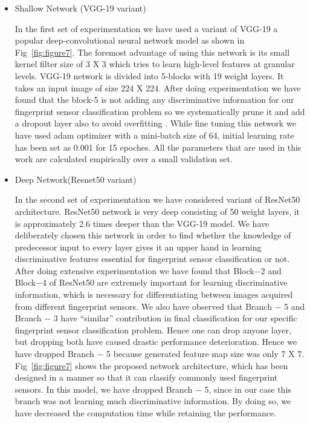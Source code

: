 \documentclass[12pt, a4paper,twoside]{article}
\begin{document}
	\begin{itemize}
		\item Shallow Network (VGG-19 variant)
	
	In the first set of experimentation we have used a variant of VGG-19 a popular deep-convolutional neural network model as shown in Fig~\ref{fig:figure7}. The foremost advantage of using this network is its small kernel filter size of 3 X 3 which tries to learn high-level features at granular levels. VGG-19 network is divided into 5-blocks with 19 weight layers. It takes an input image of size 224 X 224. After doing experimentation we have found that the block-5 is not adding any discriminative information for our fingerprint sensor classification problem so we systematically prune it and add a dropout layer also to avoid overfitting . While fine tuning this network we have used adam  optimizer with a mini-batch size of 64, initial learning rate has been set as 0.001 for 15 epoches. All the parameters that are used in this work are calculated empirically over a small validation set.

	\item Deep Network(Resnet50 variant)

	In the second set of experimentation we have considered variant of ResNet50 architecture. ResNet50 network is very deep consisting of 50 weight layers, it is approximately 2.6 times deeper than the VGG-19 model. We have deliberately chosen this network in order to find whether the knowledge of predecessor input to every layer gives it an upper hand in learning discriminative features essential for fingerprint sensor classification or not.
	After doing extensive experimentation we have found that Block−2 and Block−4 of ResNet50 are extremely important for learning discriminative information, which is necessary for differentiating between images acquired from different fingerprint sensors. We also have observed that Branch − 5 and Branch − 3 have “similar” contribution in final classification for our specific fingerprint sensor classification problem. Hence one can drop anyone layer, but dropping both have caused drastic performance deterioration. Hence we have dropped Branch − 5 because generated feature map size was only 7 X 7. Fig~\ref{fig:figure7} shows the proposed network architecture, which has been designed in a manner so that it can classify commonly used fingerprint sensors. In this model, we have dropped Branch − 5, since in our case this branch was not learning much discriminative information. By doing so, we have decreased the computation time while retaining the performance.
\end{itemize}
\end{document}
